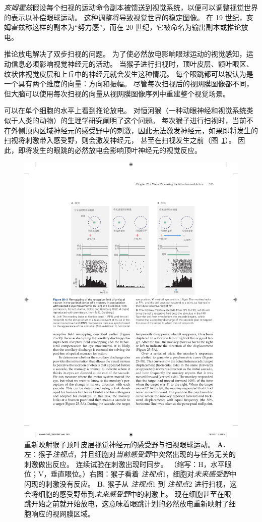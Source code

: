 \textit{亥姆霍兹}假设每个扫视的运动命令副本被馈送到视觉系统，以便可以调整视觉世界的表示以补偿眼球运动。
这种调整将导致视觉世界的稳定图像。
在 19 世纪，亥姆霍兹称这样的副本为“努力感”，而在 20 世纪，它被命名为输出副本或推论放电。


推论放电解决了双步扫视的问题。
为了使必然放电影响眼球运动的视觉感知，运动信息必须影响视觉神经元的活动。
当猴子进行扫视时，顶叶皮层、额叶眼区、纹状体视觉皮层和上丘中的神经元就会发生这种情况。
每个眼跳都可以被认为是一个具有两个维度的向量：方向和振幅。
尽管每次扫视后的视网膜图像都不同，但大脑可以使用每次扫视的向量从视网膜图像序列中重建整个视觉场景。


可以在单个细胞的水平上看到推论放电。
对恒河猴（一种动眼神经和视觉系统类似于人类的动物）的生理学研究阐明了这个问题。
每次猴子进行扫视时，当前不在外侧顶内区域神经元的感受野中的刺激，因此无法激发神经元，如果即将发生的扫视将刺激带入感受野，则会激发神经元， 甚至在扫视发生之前（图~\ref{fig:25_3}）。
因此，即将发生的眼跳的必然放电会影响顶叶神经元的视觉反应。


\begin{figure}[htbp]
	\centering
	\includegraphics[width=0.9\linewidth]{chap25/fig_25_3}
	\caption{重新映射猴子顶叶皮层视觉神经元的感受野与扫视眼球运动\cite{duhamel1992updating}。
		\textbf{A.} 左：猴子\textit{注视点}，并且细胞对\textit{当前感受野}中突然出现的与任务无关的刺激做出反应。
		连续试验在刺激出现时同步。 （缩写：H，水平眼位；V，垂直眼位。）右图：猴子看着 \textit{注视点}1，细胞对\textit{未来感受野}中闪现的刺激没有反应。
		\textbf{B.} 猴子从 \textit{注视点}1 到 \textit{注视点}2 进行扫视，这会将细胞的感受野带到\textit{未来感受野}中的刺激上。
		现在细胞甚至在眼跳开始之前就开始放电，这意味着眼跳计划的必然放电重新映射了细胞响应的视网膜区域。}
	\label{fig:25_3}
\end{figure}


